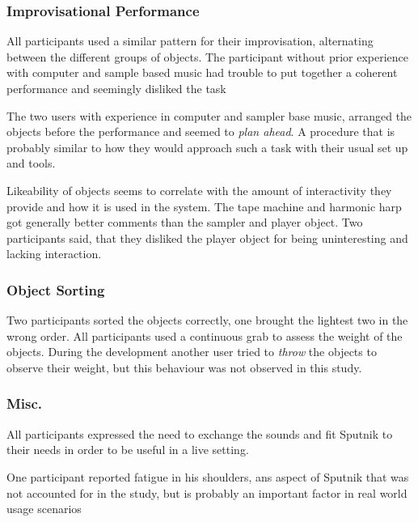 \documentclass[10pt,a4paper]{scrartcl}
\begin{document}

\subsubsection{Improvisational Performance}
All participants used a similar pattern for their improvisation, alternating between the different groups of objects. The participant without prior experience with computer and sample based music had trouble to put together a coherent performance and seemingly disliked the task

The two users with experience in computer and sampler base music, arranged the objects before the performance and seemed to \emph{plan ahead}. A procedure that is probably similar to how they would approach such a task with their usual set up and tools.

Likeability of objects seems to correlate with the amount of interactivity they provide and how it is used in the system. The tape machine and harmonic harp got generally better comments than the sampler and player object. Two participants said, that they disliked the player object for being uninteresting and lacking interaction.


\subsubsection{Object Sorting}
Two participants sorted the objects correctly, one brought the lightest two in the wrong order. All participants used a continuous grab to assess the weight of the objects. During the development another user tried to \emph{throw} the objects to observe their weight, but this behaviour was not observed in this study.

\subsubsection{Misc.}
All participants expressed the need to exchange the sounds and fit Sputnik to their needs in order to be useful in a live setting.

One participant reported fatigue in his shoulders, ans aspect of Sputnik that was not accounted for in the study, but is probably an important factor in real world usage scenarios
\end{document}
